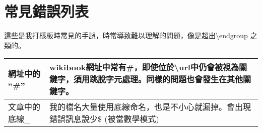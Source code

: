 \documentclass[class=NCU_thesis, crop=false]{standalone}
\begin{document}
\chapter{常見錯誤列表}
這些是我打樣板時常見的手誤，時常導致難以理解的問題，像是超出\textbackslash{}endgroup 之類的。

\begin{table}[h]
    \centering
    \begin{tabularx}{\textwidth}{| l | X |}
        \hline
        網址中的 ``\#'' & wikibook網址中常有\#，即使位於\textbackslash{}url中仍會被視為關鍵字，須用跳脫字元處理。同樣的問題也會發生在其他關鍵字。 \\ \hline
        文章中的底線\_  & 我的檔名大量使用底線命名，也是不小心就漏掉。會出現錯誤訊息說少\$ (被當數學模式) \\ \hline
    \end{tabularx}
\end{table}
\end{document}
